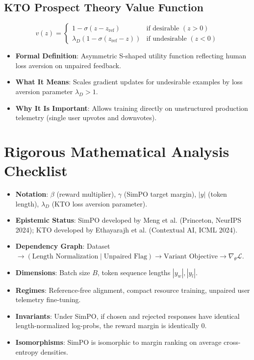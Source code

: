 \documentclass[11pt,a4paper]{article}
\theoremstyle{definition}
\begin{document}
\subsection{KTO Prospect Theory Value Function}
{\boldmath
\begin{equation}
v(z) = \begin{cases} 1 - \sigma(z - z_{\text{ref}}) & \text{if desirable } (z > 0) \\ \lambda_D (1 - \sigma(z_{\text{ref}} - z)) & \text{if undesirable } (z < 0) \end{cases}
\end{equation}
}
\begin{itemize}
    \item \textbf{Formal Definition}: Asymmetric S-shaped utility function reflecting human loss aversion on unpaired feedback.
    \item \textbf{What It Means}: Scales gradient updates for undesirable examples by loss aversion parameter $\lambda_D > 1$.
    \item \textbf{Why It Is Important}: Allows training directly on unstructured production telemetry (single user upvotes and downvotes).
\end{itemize}

\section{Rigorous Mathematical Analysis Checklist}

\begin{itemize}
    \item \textbf{Notation}: $\beta$ (reward multiplier), $\gamma$ (SimPO target margin), $|y|$ (token length), $\lambda_D$ (KTO loss aversion parameter).
    \item \textbf{Epistemic Status}: SimPO developed by Meng et al. (Princeton, NeurIPS 2024); KTO developed by Ethayarajh et al. (Contextual AI, ICML 2024).
    \item \textbf{Dependency Graph}: Dataset $\to (\text{Length Normalization} \mid \text{Unpaired Flag}) \to \text{Variant Objective} \to \nabla_\theta \mathcal{L}$.
    \item \textbf{Dimensions}: Batch size $B$, token sequence lengths $|y_w|, |y_l|$.
    \item \textbf{Regimes}: Reference-free alignment, compact resource training, unpaired user telemetry fine-tuning.
    \item \textbf{Invariants}: Under SimPO, if chosen and rejected responses have identical length-normalized log-probs, the reward margin is identically $0$.
    \item \textbf{Isomorphisms}: SimPO is isomorphic to margin ranking on average cross-entropy densities.
\end{itemize}
\end{document}

